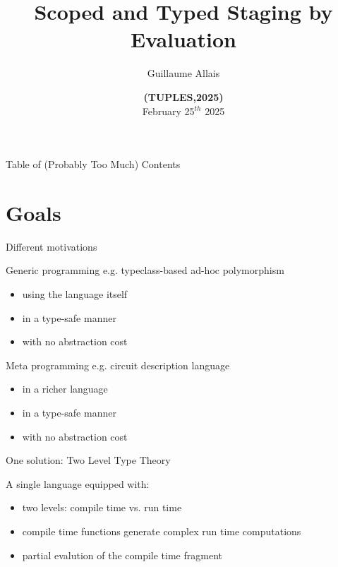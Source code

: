 \documentclass[aspectratio=169]{beamer}
\title{Scoped and Typed Staging by Evaluation}
\author{Guillaume Allais}
\institute{University of Strathclyde}
\date{{\bf {\color{TUPLEGRAY}(}{\color{TUPLEBLUE}TUPLES}{\color{TUPLEGRAY},}2025{\color{TUPLEGRAY})}} \\ February 25$^{th}$ 2025}
\begin{document}
\begin{frame}
  \maketitle
\end{frame}

\begin{frame}{Table of (Probably Too Much) Contents}
  \tableofcontents
\end{frame}

\section{Goals}

\begin{frame}{Different motivations}

Generic programming e.g. typeclass-based ad-hoc polymorphism

\begin{itemize}
  \item<3-> using the language itself
  \item<2-> in a type-safe manner
  \item<2-> with no abstraction cost
\end{itemize}

\bigskip

Meta programming e.g. circuit description language

\begin{itemize}
  \item<4-> in a richer language
  \item<2-> in a type-safe manner
  \item<2-> with no abstraction cost
\end{itemize}

\end{frame}

\begin{frame}{One solution: Two Level Type Theory}

A single language equipped with:

\begin{itemize}
  \item<2-> two levels: compile time vs. run time
  \item<3-> compile time functions generate complex run time computations
  \item<4-> partial evalution of the compile time fragment
\end{itemize}

\vfill


\end{frame}
\end{document}
